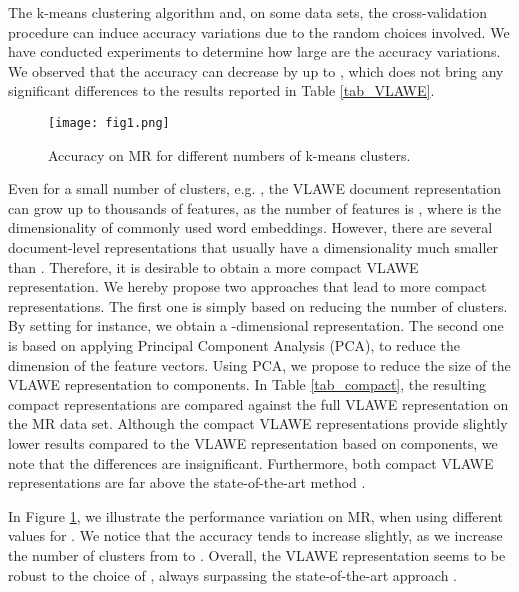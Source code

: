 \documentclass[11pt,a4paper]{article}
\begin{document}
The k-means clustering algorithm and, on some data sets, the cross-validation procedure can induce accuracy variations due to the random choices involved. We have conducted experiments to determine how large are the accuracy variations. We observed that the accuracy can decrease by up to , which does not bring any significant differences to the results reported in Table \ref{tab_VLAWE}.

\begin{figure}[!t]
\begin{center}
\texttt{[image: fig1.png]}
\end{center}
\vspace*{-0.4cm}
\caption{Accuracy on MR for different numbers of k-means clusters.}
\label{fig1}
\vspace*{-0.5cm}
\end{figure}

Even for a small number of clusters, e.g. , the VLAWE document representation can grow up to thousands of features, as the number of features is , where  is  the dimensionality of commonly used word embeddings. However, there are several document-level representations that usually have a dimensionality much smaller than . Therefore, it is desirable to obtain a more compact VLAWE representation. We hereby propose two approaches that lead to more compact representations. The first one is simply based on reducing the number of clusters. By setting  for instance, we obtain a -dimensional representation. The second one is based on applying Principal Component Analysis (PCA), to reduce the dimension of the feature vectors. Using PCA, we propose to reduce the size of the VLAWE representation to  components. In Table \ref{tab_compact}, the resulting compact representations are compared against the full VLAWE representation on the MR data set. Although the compact VLAWE representations provide slightly lower results compared to the VLAWE representation based on  components, we note that the differences are insignificant. Furthermore, both compact VLAWE representations are far above the state-of-the-art method \cite{Cheng-IJCAI-2018}.

In Figure \ref{fig1}, we illustrate the performance variation on MR, when using different values for . We notice that the accuracy tends to increase slightly, as we increase the number of clusters from  to . Overall, the VLAWE representation seems to be robust to the choice of , always surpassing the state-of-the-art approach \cite{Cheng-IJCAI-2018}.
\end{document}
